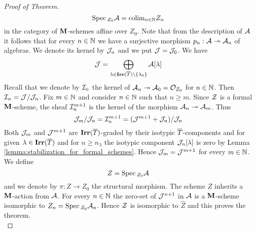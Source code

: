 \begin{proof}[Proof of Theorem]
$$\mathrm{Spec}\,_{Z_0}{\mathcal A} = \mathrm{colim}_{n\in {\mathbb N}}Z_n$$
in the category of $\mathbf{M}$-schemes affine over $Z_0$. Note that from the description of ${\mathcal A}$ it follows that for every $n\in {\mathbb N}$ we have a surjective morphism $p_n:{\mathcal A}\twoheadrightarrow {\mathcal A}_n$ of algebras. We denote its kernel by ${\mathcal J}_n$ and we put ${\mathcal J} = {\mathcal J}_0$. We have
$${\mathcal J}=\bigoplus_{\lambda \in \mathbf{Irr}(\overline{T})\setminus \{\lambda_0\}}{\mathcal A}[\lambda]$$
Recall that we denote by ${\mathcal I}_n$ the kernel of ${\mathcal A}_n\twoheadrightarrow {\mathcal A}_0={\mathcal O}_{Z_0}$ for $n\in {\mathbb N}$. Then ${\mathcal I}_n={\mathcal J}/{\mathcal J}_n$. Fix $m\in {\mathbb N}$ and consider $n\in {\mathbb N}$ such that $n\geq m$. Since ${\mathcal Z}$ is a formal $\mathbf{M}$-scheme, the sheaf ${\mathcal I}_n^{m+1}$ is the kernel of the morphism ${\mathcal A}_n\twoheadrightarrow {\mathcal A}_m$. Thus
$${\mathcal J}_m/{\mathcal J}_n={\mathcal I}_n^{m+1}=({\mathcal J}^{m+1}+{\mathcal J}_n)/{\mathcal J}_n$$
Both ${\mathcal J}_m$ and ${\mathcal J}^{m+1}$ are $\mathbf{Irr}(\overline{T})$-graded by their isotypic $\overline{T}$-components and for given $\lambda\in \mathbf{Irr}(\overline{T})$ and for $n \geq n_{\lambda}$ the isotypic component ${\mathcal J}_n[\lambda]$ is zero by Lemma \ref{lemma:stabilization_for_formal_schemes}. Hence ${\mathcal J}_m={\mathcal J}^{m+1}$ for every $m \in {\mathbb N}$.
We define
$$Z=\mathrm{Spec}\,_{Z_0}{\mathcal A}$$
and we denote by $\pi:Z\to Z_0$ the structural morphism. The scheme $Z$ inherits a $\mathbf{M}$-action from ${\mathcal A}$. For every $n\in {\mathbb N}$ the zero-set of ${\mathcal J}^{n+1}$ in ${\mathcal A}$ is a $\mathbf{M}$-scheme isomorphic to $Z_n = \mathrm{Spec}\,_{Z_0}{\mathcal A}_n$. Hence ${\mathcal Z}$ is isomorphic to $\widehat{Z}$ and this proves the theorem.\\
\end{proof}

